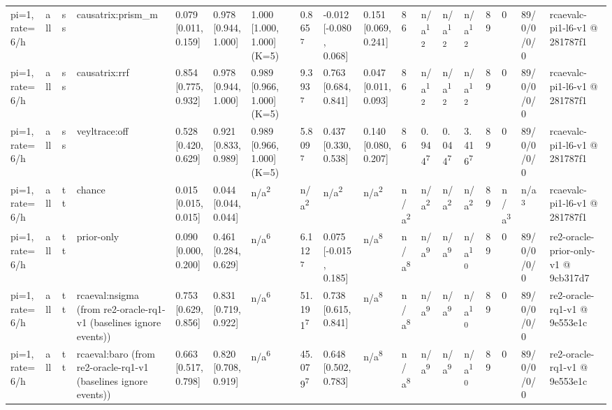 \begin{table}[t]
\begin{tabular}{llllllllllllllllll}
pi=1, rate=6/h & all & ss & causatrix:prism\_m & 0.079 [0.011, 0.159] & 0.978 [0.944, 1.000] & 1.000 [1.000, 1.000] (K=5) & 0.865\textsuperscript{7} & -0.012 [-0.080, 0.068] & 0.151 [0.069, 0.241] & 86 & n/a\textsuperscript{12} & n/a\textsuperscript{12} & n/a\textsuperscript{12} & 89 & 0 & 89/0/0/0/0 & rcaevalc-pi1-l6-v1 @ 281787f1 \\
pi=1, rate=6/h & all & ss & causatrix:rrf & 0.854 [0.775, 0.932] & 0.978 [0.944, 1.000] & 0.989 [0.966, 1.000] (K=5) & 9.393\textsuperscript{7} & 0.763 [0.684, 0.841] & 0.047 [0.011, 0.093] & 86 & n/a\textsuperscript{12} & n/a\textsuperscript{12} & n/a\textsuperscript{12} & 89 & 0 & 89/0/0/0/0 & rcaevalc-pi1-l6-v1 @ 281787f1 \\
pi=1, rate=6/h & all & ss & veyltrace:off & 0.528 [0.420, 0.629] & 0.921 [0.833, 0.989] & 0.989 [0.966, 1.000] (K=5) & 5.809\textsuperscript{7} & 0.437 [0.330, 0.538] & 0.140 [0.080, 0.207] & 86 & 0.944\textsuperscript{7} & 0.044\textsuperscript{7} & 3.416\textsuperscript{7} & 89 & 0 & 89/0/0/0/0 & rcaevalc-pi1-l6-v1 @ 281787f1 \\
pi=1, rate=6/h & all & tt & chance & 0.015 [0.015, 0.015] & 0.044 [0.044, 0.044] & n/a\textsuperscript{2} & n/a\textsuperscript{2} & n/a\textsuperscript{2} & n/a\textsuperscript{2} & n/a\textsuperscript{2} & n/a\textsuperscript{2} & n/a\textsuperscript{2} & n/a\textsuperscript{2} & 89 & n/a\textsuperscript{3} & n/a\textsuperscript{3} & rcaevalc-pi1-l6-v1 @ 281787f1 \\
pi=1, rate=6/h & all & tt & prior-only & 0.090 [0.000, 0.200] & 0.461 [0.284, 0.629] & n/a\textsuperscript{6} & 6.112\textsuperscript{7} & 0.075 [-0.015, 0.185] & n/a\textsuperscript{8} & n/a\textsuperscript{8} & n/a\textsuperscript{9} & n/a\textsuperscript{9} & n/a\textsuperscript{10} & 89 & 0 & 89/0/0/0/0 & re2-oracle-prior-only-v1 @ 9cb317d7 \\
pi=1, rate=6/h & all & tt & rcaeval:nsigma (from re2-oracle-rq1-v1 (baselines ignore events)) & 0.753 [0.629, 0.856] & 0.831 [0.719, 0.922] & n/a\textsuperscript{6} & 51.191\textsuperscript{7} & 0.738 [0.615, 0.841] & n/a\textsuperscript{8} & n/a\textsuperscript{8} & n/a\textsuperscript{9} & n/a\textsuperscript{9} & n/a\textsuperscript{10} & 89 & 0 & 89/0/0/0/0 & re2-oracle-rq1-v1 @ 9e553e1c \\
pi=1, rate=6/h & all & tt & rcaeval:baro (from re2-oracle-rq1-v1 (baselines ignore events)) & 0.663 [0.517, 0.798] & 0.820 [0.708, 0.919] & n/a\textsuperscript{6} & 45.079\textsuperscript{7} & 0.648 [0.502, 0.783] & n/a\textsuperscript{8} & n/a\textsuperscript{8} & n/a\textsuperscript{9} & n/a\textsuperscript{9} & n/a\textsuperscript{10} & 89 & 0 & 89/0/0/0/0 & re2-oracle-rq1-v1 @ 9e553e1c \\

\end{tabular}
\end{table}
